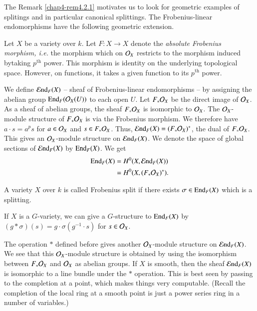 The Remark \ref{chap4-rem4.2.1} motivates us to look for geometric
examples of splitings and in particular canonical splittings. The
Frobenius-linear endomorphisms have the following geometric extension.

Let $X$ be a variety over $k$. Let $F:X\to X$ denote the {\em absolute
  Frobenius morphism, i.e.} the morphism which on $\mathcal{O}_{X}$ restricts
to the morphism induced by\pageoriginale taking\label{page42} $p^{\text{th}}$ power. This
morphism is identity on the underlying topological space. However, on
functions, it takes a given function to its $p^{\text{th}}$ power.

We define $\operatorname{\mathcal{E}nd}_{F}(X)$ -- sheaf of Frobenius-linear endomorphisms --
by assigning the abelian group $\operatorname{End}_{F}(\mathcal{O}_{X}(U))$ to each open
$U$. Let $F_{\ast}\mathcal{O}_{X}$ be the direct image of $\mathcal{O}_{X}$. As a sheaf
of abelian groups, the sheaf $F_{\ast}\mathcal{O}_{X}$ is isomorphic to
$\mathcal{O}_{X}$. The $\mathcal{O}_{X}$-module structure of $F_{\ast}\mathcal{O}_{X}$ is via the
Frobenius morphism. We therefore have $a\cdot s=a^{p}s$ for $a\in
\mathcal{O}_{X}$ and $s\in F_{\ast}\mathcal{O}_{X}$. Thus,
$\operatorname{\mathcal{E}nd}_{F}(X)=(F_{\ast}\mathcal{O}_{X})^{*}$, the dual of
$F_{\ast}\mathcal{O}_{X}$. This gives an $\mathcal{O}_{X}$-module structure on
$\operatorname{\mathcal{E}nd}_{F}(X)$. We denote the space of global sections of
$\operatorname{\mathcal{E}nd}_{F}(X)$ by $\operatorname{End}_{F}(X)$. We get
\begin{align*}
\operatorname{End}_{F}(X) &= H^{0}(X,\operatorname{\mathcal{E}nd}_{F}(X))\\
&= H^{0}(X,(F_{\ast}\mathcal{O}_{X})^{\ast}).
\end{align*}

\begin{definition}\label{chap4-defi4.3.9}
A variety $X$ over $k$ is called 
Frobenius split if there exists
$\sigma\in \operatorname{End}_{F}(X)$ which is a splitting.
\end{definition}

If $X$ is a $G$-variety, we can give a $G$-structure to $\operatorname{End}_{F}(X)$
by $(g\ast \sigma)(s)=g\cdot\sigma(g^{-1}\cdot s)$ for $s\in \mathcal{O}_{X}$.

The operation $\ast$ defined before gives another $\mathcal{O}_{X}$-module
structure on $\operatorname{\mathcal{E}nd}_{F}(X)$. We see that this $\mathcal{O}_{X}$-module
structure is obtained by using the isomorphism between
$F_{\ast}\mathcal{O}_{X}$ and $\mathcal{O}_{X}$ as abelian groups. If $X$ is smooth,
then the sheaf $\operatorname{\mathcal{E}nd}_{F}(X)$ is isomorphic to a line bundle under the
$*$ operation. This is best seen by passing to the completion at a
point, which makes things very computable. (Recall the completion of
the local ring at a smooth point is just a power series ring in a
number of variables.)

